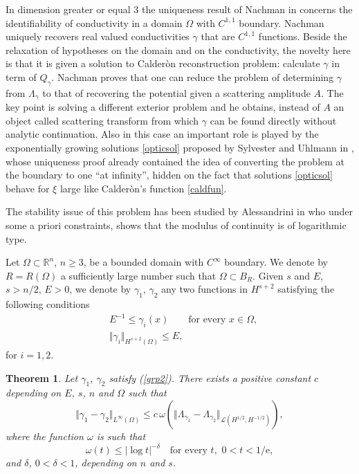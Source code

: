 \documentclass[10pt, a4paper, twoside, openright]{book}
\theoremstyle{definition}
\theoremstyle{plain}
\newtheorem{theorem}[subsection]{Theorem}
\theoremstyle{plain}
\theoremstyle{plain}
\theoremstyle{plain}
\theoremstyle{plain}
\theoremstyle{plain}
\theoremstyle{plain}
\theoremstyle{plain}
\begin{document}
In dimension greater or equal 3
the uniqueness result of Nachman in
\cite{Na88} concerns the identifiability of conductivity
in a domain $\Omega$ with $C^{1,1}$ boundary. Nachman uniquely recovers
real valued conductivities $\gamma$ that are $C^{1,1}$ functions.
Beside the relaxation of hypotheses on the domain and on the conductivity,
the novelty here is that it is given a solution to Calder\`on reconstruction problem:
calculate $\gamma$ in term of $Q_{\gamma}$.
Nachman proves that one can reduce the problem of determining $\gamma$
from $\Lambda_{\gamma}$
to that of recovering the potential given a scattering amplitude $A$.
The key point is solving a different exterior problem and
he obtains, instead of $A$ an object called scattering transform from which
$\gamma$ can be found directly without analytic continuation.
Also in this case an important role is played by the exponentially growing
solutions
\eqref{opticsol} proposed by Sylvester and Uhlmann in \cite{Sy-Uh}, whose uniqueness
proof already contained the idea of converting the problem at the boundary
to one ``at infinity'', hidden on the fact that solutions
\eqref{opticsol} behave for $\xi$ large like Calder\`on's function \eqref{caldfun}.

The stability issue of this problem has been studied by Alessandrini in \cite{Al88} who under
some a priori constraints, shows that the modulus of continuity
is of logarithmic type.

Let $\Omega\subset\mathbb{R}^{n}$, $n\geq3$, be a bounded domain with
$C^{\infty}$ boundary.
We denote by $R=R(\Omega)$ a sufficiently large number such that
$\Omega\subset B_{R}$. Given $s$ and $E$, $s>n/2$, $E>0$,
we denote by $\gamma_1$, $\gamma_2$ any two functions in $H^{s+2}$
satisfying the following conditions
\begin{subequations}\label{grp2}
\begin{align}
\label{E}
&E^{-1}\leq\gamma_{i}(x)\qquad\textrm{for every }x\in\Omega,\\[2mm]
\label{gamma3}
&\Vert\gamma_i\Vert_{H^{s+2}(\Omega)}\leq E,
\end{align}
\end{subequations}
for $i=1,2$.
\begin{theorem}
\label{stabcondteo}
Let $\gamma_1$, $\gamma_2$ satisfy (\ref{grp2}).
There exists a positive constant $c$ depending on $E$, $s$, $n$
and $\Omega$ such that
\begin{equation}
\label{stabcond}
\Vert\gamma_1-\gamma_2\Vert_{L^{\infty}(\Omega)}
\leq c\,\omega\left(\Vert\Lambda_{\gamma_1}-\Lambda_{\gamma_2}
\Vert_{\mathcal{L}(H^{1/2},H^{-1/2})} \right),
\end{equation}
where the function $\omega$ is such that
\begin{equation}
\label{omega}
\omega(t)\leq|\log t|^{-\delta}\quad\textrm{for every }t,\,\,0<t<1/\textrm{e},
\end{equation}
and $\delta$, $0<\delta<1$, depending on $n$ and $s$.
\end{theorem}
\end{document}
